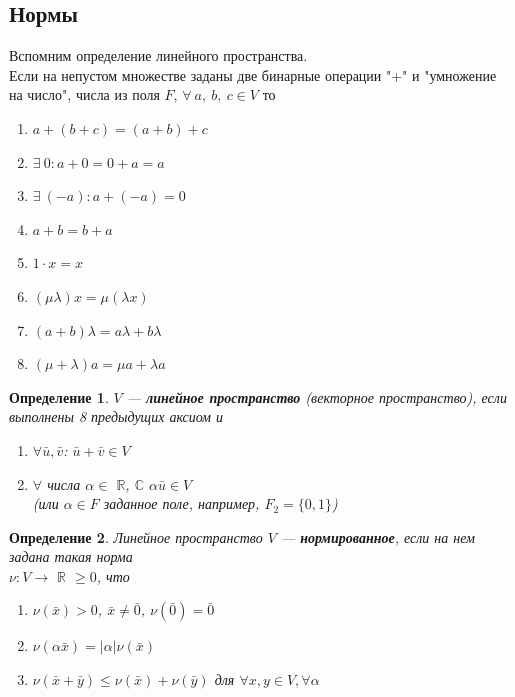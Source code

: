 \documentclass[12pt]{article}
\newtheorem*{definition}{Определение}
\begin{document}
	\subsection{Нормы}
	Вспомним определение линейного пространства.\\
	Если на непустом множестве заданы две бинарные операции "+" и "умножение на число", числа из поля $F$, $\forall ~a,~b,~c\in V$ то\begin{enumerate}
		\item $a+(b+c) = (a+b)+c$
		\item $\exists~0: a+0 = 0+a = a$
		\item $\exists~ (-a): a+(-a) = 0$
		\item $a+b = b+a$
		\item $1\cdot x = x$
		\item $ (\mu \lambda)x = \mu(\lambda x)$
		\item $(a+b)\lambda = a\lambda + b\lambda$
		\item $(\mu + \lambda)a = \mu a + \lambda a$
	\end{enumerate}
	\begin{definition}
	$V$ --- \textbf{линейное пространство} (векторное пространство), если выполнены 8 предыдущих аксиом и \begin{enumerate}
		\item $\forall \bar u, \bar v$: $\bar u + \bar v \in V$
		\item $\forall$ числа $\alpha \in$ $\mathbb{R}$, $\mathbb{C}$ $\alpha \bar u \in V$\\ 
		(или $\alpha \in F$ заданное поле, например, $F_2 = \{ 0, 1 \}$)\end{enumerate}
	\end{definition}
	\begin{definition}
	Линейное пространство $V$ --- \textbf{нормированное}, если на нем задана такая норма \\$\nu : V \to$ $\mathbb{R}$ $\geqslant 0$, что\begin{enumerate}
		\item $\nu(\bar x) > 0$, $\bar x \neq \bar 0$, $\nu(\bar 0) = \bar 0$
		\item $\nu(\alpha \bar x) = |\alpha|\nu(\bar x)$
		\item $\nu(\bar x + \bar y) \leq \nu(\bar x) + \nu(\bar y)$ для $\forall x, y \in V, \forall \alpha$
	\end{enumerate}
	\end{definition}
	
\end{document}
